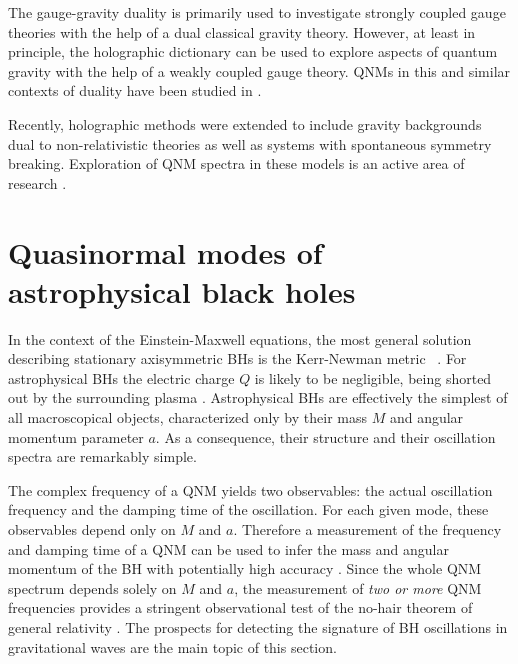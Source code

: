 \documentclass[]{iopart}
\begin{document}
The gauge-gravity duality is primarily used to investigate strongly 
coupled gauge theories with the help of a dual classical gravity theory. However, 
at least in principle, the holographic dictionary can be used to 
explore aspects of quantum gravity with the help of a weakly coupled gauge theory.
QNMs in this and similar contexts of duality have been studied in 
\cite{Fidkowski:2003nf,Festuccia:2005pi,Festuccia:2008zx,Amado:2008hw}.

Recently, holographic methods were extended to include gravity backgrounds
dual to non-relativistic theories as well as systems with spontaneous symmetry
breaking.  Exploration of QNM spectra in these models is an active area of
research \cite{Hartnoll:2009sz,Herzog:2009xv}.

\section{\label{sec:astro}Quasinormal modes of astrophysical black holes}

In the context of the Einstein-Maxwell equations, the most general solution
describing stationary axisymmetric BHs is the Kerr-Newman metric
~\cite{Heusler:1998ua}. For astrophysical BHs the electric charge $Q$ is
likely to be negligible, being shorted out by the surrounding plasma
\cite{Gibbons:1975kk,Blandford:1977ds}.  Astrophysical BHs are effectively the
simplest of all macroscopical objects, characterized only by their mass $M$
and angular momentum parameter $a$.  As a consequence, their structure and
their oscillation spectra are remarkably simple.

The complex frequency of a QNM yields two observables: the actual oscillation
frequency and the damping time of the oscillation. For each given mode, these
observables depend only on $M$ and $a$. Therefore a measurement of the
frequency and damping time of a QNM can be used to infer the mass and angular
momentum of the BH with potentially high accuracy
\cite{Echeverria:1989hg,Finn:1992wt,Berti:2005ys,Berti:2007zu}. Since the
whole QNM spectrum depends solely on $M$ and $a$, the measurement of {\em two
  or more} QNM frequencies provides a stringent observational test of the
no-hair theorem of general relativity
\cite{Dreyer:2003bv,Berti:2006cc,Berti:2007zu,Berti:2006qt}.  The prospects
for detecting the signature of BH oscillations in gravitational waves are the
main topic of this section.
\end{document}
